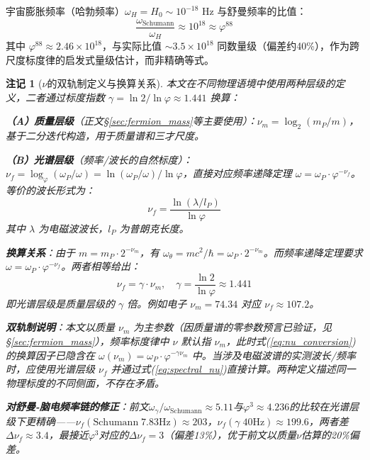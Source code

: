 \documentclass[12pt,a4paper,twocolumn]{article}
\renewcommand{\phi}{\varphi}
\newtheorem{remark}[theorem]{注记}
\begin{document}
宇宙膨胀频率（哈勃频率）$\omega_{H} = H_0 \sim 10^{-18}$ Hz 与舒曼频率的比值：
\begin{equation}
\frac{\omega_{\text{Schumann}}}{\omega_{H}} \approx 10^{18} \approx \phi^{88}
\end{equation}
其中 $\phi^{88} \approx 2.46 \times 10^{18}$，与实际比值 $\sim 3.5 \times 10^{18}$ 同数量级（偏差约40\%），作为跨尺度标度律的启发式量级估计，而非精确等式。

\begin{remark}[$\nu$的双轨制定义与换算关系]
\label{rmk:nu_dual_track}
本文在不同物理语境中使用两种层级的定义，二者通过标度指数 $\gamma = \ln 2/\ln\phi \approx 1.441$ 换算：

\textbf{（A）质量层级}（正文§\ref{sec:fermion_mass}等主要使用）：$\nu_m = \log_2(m_P/m)$，基于二分迭代构造，用于质量谱和三才尺度。

\textbf{（B）光谱层级}（频率/波长的自然标度）：$\nu_f = \log_\phi(\omega_P/\omega) = \ln(\omega_P/\omega)/\ln\phi$，直接对应频率递降定理 $\omega = \omega_P \cdot \phi^{-\nu_f}$。等价的波长形式为：
\begin{equation}
\nu_f = \frac{\ln(\lambda/l_P)}{\ln\phi}
\label{eq:spectral_nu}
\end{equation}
其中 $\lambda$ 为电磁波波长，$l_P$ 为普朗克长度。

\textbf{换算关系}：由于 $m = m_P \cdot 2^{-\nu_m}$，有 $\omega_\theta = mc^2/\hbar = \omega_P \cdot 2^{-\nu_m}$。而频率递降定理要求 $\omega = \omega_P \cdot \phi^{-\nu_f}$。两者相等给出：
\begin{equation}
\nu_f = \gamma \cdot \nu_m, \quad \gamma = \frac{\ln 2}{\ln\phi} \approx 1.441
\label{eq:nu_conversion}
\end{equation}
即光谱层级是质量层级的 $\gamma$ 倍。例如电子 $\nu_m = 74.34$ 对应 $\nu_f \approx 107.2$。

\textbf{双轨制说明}：本文以质量 $\nu_m$ 为主参数（因质量谱的零参数预言已验证，见§\ref{sec:fermion_mass}），频率标度律中 $\nu$ 默认指 $\nu_m$，此时式(\ref{eq:nu_conversion})的换算因子已隐含在 $\omega(\nu_m) = \omega_P \cdot \phi^{-\gamma\nu_m}$ 中。当涉及电磁波谱的实测波长/频率时，应使用光谱层级 $\nu_f$ 并通过式(\ref{eq:spectral_nu})直接计算。两种定义描述同一物理标度的不同侧面，不存在矛盾。

\textbf{对舒曼-脑电频率链的修正}：前文$\omega_\gamma/\omega_{\text{Schumann}} \approx 5.11$与$\phi^3 \approx 4.236$的比较在光谱层级下更精确——$\nu_f(\text{Schumann}\;7.83\text{Hz}) \approx 203$，$\nu_f(\gamma\;40\text{Hz}) \approx 199.6$，两者差$\Delta\nu_f \approx 3.4$，最接近$\phi^3$对应的$\Delta\nu_f = 3$（偏差13\%），优于前文以质量$\nu$估算的20\%偏差。
\end{remark}
\end{document}
